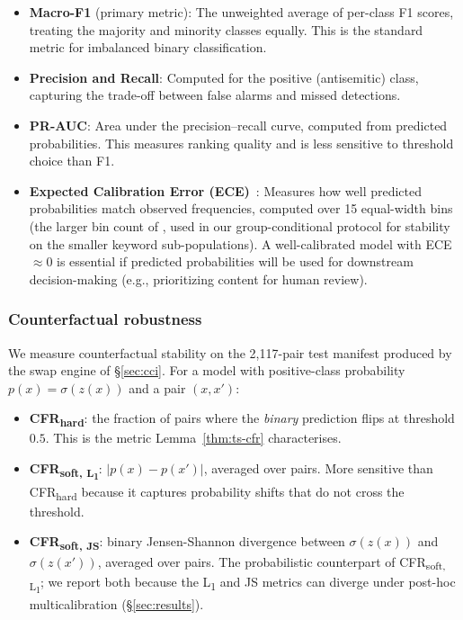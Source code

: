 \documentclass[10pt,a4paper]{article}
\begin{document}
\begin{itemize}[leftmargin=*,itemsep=1pt]
    \item \textbf{Macro-F1} (primary metric): The unweighted average of per-class F1 scores, treating the majority and minority classes equally. This is the standard metric for imbalanced binary classification.
    \item \textbf{Precision and Recall}: Computed for the positive (antisemitic) class, capturing the trade-off between false alarms and missed detections.
    \item \textbf{PR-AUC}: Area under the precision--recall curve, computed from predicted probabilities. This measures ranking quality and is less sensitive to threshold choice than F1.
    \item \textbf{Expected Calibration Error (ECE)}~\citep{guo2017calibration}: Measures how well predicted probabilities match observed frequencies, computed over 15 equal-width bins (the larger bin count of \citet{kumar2019verified}, used in our group-conditional protocol for stability on the smaller keyword sub-populations). A well-calibrated model with ECE $\approx 0$ is essential if predicted probabilities will be used for downstream decision-making (e.g., prioritizing content for human review).
\end{itemize}

\subsubsection{Counterfactual robustness}

We measure counterfactual stability on the 2{,}117-pair test manifest produced by the swap engine of \S\ref{sec:cci}. For a model with positive-class probability $p(x) = \sigma(z(x))$ and a pair $(x, x')$:
\begin{itemize}[leftmargin=*,itemsep=1pt]
    \item \textbf{CFR\textsubscript{hard}}: the fraction of pairs where the \emph{binary} prediction flips at threshold $0.5$. This is the metric Lemma~\ref{thm:ts-cfr} characterises.
    \item \textbf{CFR\textsubscript{soft, L\textsubscript{1}}}: $|p(x) - p(x')|$, averaged over pairs. More sensitive than CFR\textsubscript{hard} because it captures probability shifts that do not cross the threshold.
    \item \textbf{CFR\textsubscript{soft, JS}}: binary Jensen-Shannon divergence between $\sigma(z(x))$ and $\sigma(z(x'))$, averaged over pairs. The probabilistic counterpart of CFR\textsubscript{soft, L\textsubscript{1}}; we report both because the L\textsubscript{1} and JS metrics can diverge under post-hoc multicalibration (\S\ref{sec:results}).
\end{itemize}
\end{document}
